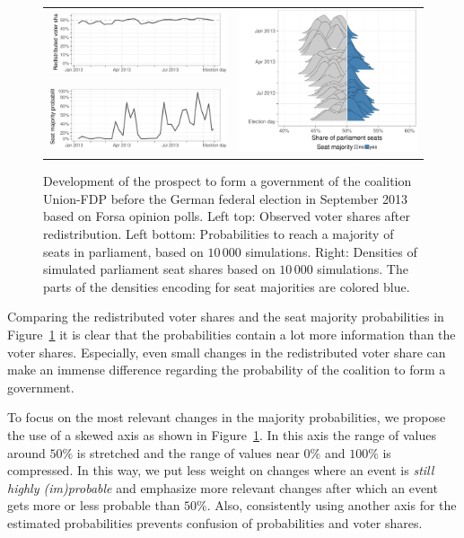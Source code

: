\documentclass[smallcondensed]{svjour3}     %
\begin{document}
\begin{figure}[H]\centering
\begin{tabular}{ll}
\includegraphics[height=.15\textwidth]{figures/2013_forsa_cdufdp_rawSharesRedist.pdf}
&
\multirow{2}{*}[13ex]{\includegraphics[height=30ex]{figures/2013_forsa_cdufdp_ridgeline.pdf}}
\\
\includegraphics[height=.15\textwidth]{figures/2013_forsa_cdufdp_prob.pdf}
\end{tabular}
\caption{Development of the prospect to form a government of the coalition Union-FDP before the German federal election in September 2013 based on Forsa opinion polls.
Left top: Observed voter shares after redistribution. Left bottom: Probabilities to reach a majority of seats in parliament, based on $10\,000$ simulations. Right: Densities of simulated parliament seat shares based on $10\,000$ simulations. The parts of the densities encoding for seat majorities are colored blue.
\label{fig:seatDist_time}
}
\end{figure}

Comparing the redistributed voter shares and the seat majority probabilities
in Figure~\ref{fig:seatDist_time} it is clear that the probabilities contain
a lot more information than the voter shares. Especially, even small changes
in the redistributed voter share can make an immense difference regarding the
probability of the coalition to form a government.

To focus on the most relevant changes in the majority probabilities, we propose
the use of a skewed axis as shown in Figure~\ref{fig:seatDist_time}. In this axis
the range of values around $50\%$ is stretched and the range of values near
$0\%$ and $100\%$ is compressed. In this way, we put less weight on changes
where an event is {\it still highly (im)probable} and emphasize more relevant
changes after which an event gets more or less probable than $50\%$. Also,
consistently using another axis for the estimated probabilities prevents
confusion of probabilities and voter shares.
\end{document}
